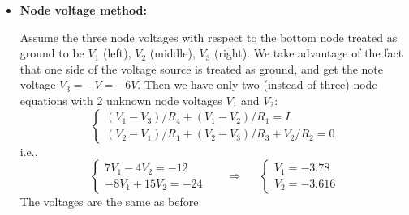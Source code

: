 \begin{itemize}
  \begin{comment}
  Alternatively, let $I_1=I$ be the loop current from the current source
  around $R_4$, $R_3$, $R_2$, $I_2$ be the loop current around $R_2$, $R_1$,
  $R_4$ and the voltage source, and $I_3$ be the loop current around $R_2$,
  $R_3$ and the voltage source, then we have the following equations:
  \[
  \left\{ \begin{array}{l} (I_2+I_3-I)R_2+I_2R_1+(I_2+I)R_4=V\\
    (I_2+I_3-I_1)R_2+(I_3-I)R_3=V\end{array}\right.
  \]
  i.e.,
  \[
  \left\{ \begin{array}{l} 7I_2-6I_3=-5\\
    8I_2+14I_3=13 \end{array}\right.
  \;\;\;\;\;\;\Longrightarrow \;\;\;\;\;
  \left\{ \begin{array}{l}
    I_2=0.055 \\  I_3=0.897 \end{array} \right.   
  \]
  We can also get the three node voltages with respect to the bottom 
  node treated as ground: 
  \begin{itemize}
    \item Right node: $V_3=-6V$ 
    \item Middle node: $V_2=-R_2(I_2+I_3-I)=-8(0.055+0.897-0.5)=-3.616V$
    \item Left node: $V_1=V_3-R_4 (I+I_2)=6-4(0.5+0.055)=-3.78V$
  \end{itemize}  
  same as before.
  \end{comment}

\item {\bf Node voltage method:}

  Assume the three node voltages with respect to the bottom node treated
  as ground to be $V_1$ (left), $V_2$ (middle), $V_3$ (right). We take 
  advantage of the fact that one side of the voltage source is treated 
  as ground, and get the note voltage $V_3=-V=-6V$. Then we have only two 
  (instead of three) node equations with 2 unknown node voltages $V_1$ and 
  $V_2$: 
  \[ 
  \left\{ \begin{array}{l}
    (V_1-V_3)/R_4+(V_1-V_2)/R_1=I \\
    (V_2-V_1)/R_1+(V_2-V_3)/R_3+V_2/R_2=0 \end{array} \right. 
  \]
  i.e.,
  \[
  \left\{ \begin{array}{l}
    7V_1-4V_2=-12 \\
    -8V_1+15V_2=-24 \end{array} \right. 
  \;\;\;\;\;\;\Longrightarrow \;\;\;\;\;
  \left\{ \begin{array}{l}
    V_1=-3.78 \\ V_2=-3.616 \end{array} \right. 
  \]
  The voltages are the same as before.
\end{itemize}
